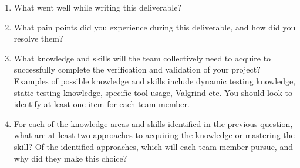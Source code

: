 \documentclass[12pt, titlepage]{article}
\begin{document}
\begin{enumerate}
  \item What went well while writing this deliverable? 

  \item What pain points did you experience during this deliverable, and how
    did you resolve them?

  \item What knowledge and skills will the team collectively need to acquire to
  successfully complete the verification and validation of your project?
  Examples of possible knowledge and skills include dynamic testing knowledge,
  static testing knowledge, specific tool usage, Valgrind etc.  You should look to
  identify at least one item for each team member.

  \item For each of the knowledge areas and skills identified in the previous
  question, what are at least two approaches to acquiring the knowledge or
  mastering the skill?  Of the identified approaches, which will each team
  member pursue, and why did they make this choice?

\end{enumerate}
\end{document}
